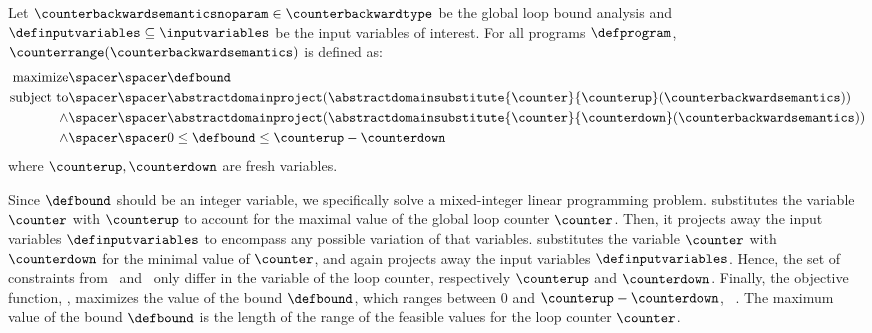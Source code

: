 \begin{definition}[$\counterrange$]
  Let $\counterbackwardsemanticsnoparam\in\counterbackwardtype$ be the global loop bound analysis and $\definputvariables\subseteq\inputvariables$ be the input variables of interest.
  For all programs $\defprogram$, $\counterrange(\counterbackwardsemantics)$ is defined as:
\begin{align}
  \label{eq:obj}
  \text{maximize} \spacer\spacer& \defbound \\
  \label{eq:a}
  \text{subject to} \spacer\spacer
    & \abstractdomainproject(\abstractdomainsubstitute{\counter}{\counterup}(\counterbackwardsemantics)) \\
    \label{eq:b}
    \land\spacer\spacer& \abstractdomainproject(\abstractdomainsubstitute{\counter}{\counterdown}(\counterbackwardsemantics)) \\
    \label{eq:slack}
    \land\spacer\spacer& 0 \le \defbound \le \counterup - \counterdown
\end{align}
where $\counterup,\counterdown$ are fresh variables.
\end{definition}
Since $\defbound$ should be an integer variable, we specifically solve a mixed-integer linear programming problem.
 substitutes the variable $\counter$ with $\counterup$ to account for the maximal value of the global loop counter $\counter$.
Then, it
projects away the input variables $\definputvariables$ to encompass any possible variation of that variables.
 substitutes the variable $\counter$ with $\counterdown$ for the minimal value of $\counter$, and again projects away the input variables $\definputvariables$.
Hence, the set of constraints from~ and~ only differ in the variable of the loop counter, respectively $\counterup$ and $\counterdown$.
Finally, the objective function, \cf{} , maximizes the value of the bound $\defbound$, which ranges between $0$ and $\counterup - \counterdown$, \cf~.
The maximum value of the bound $\defbound$ is the length of the range of the feasible values for the loop counter $\counter$.



